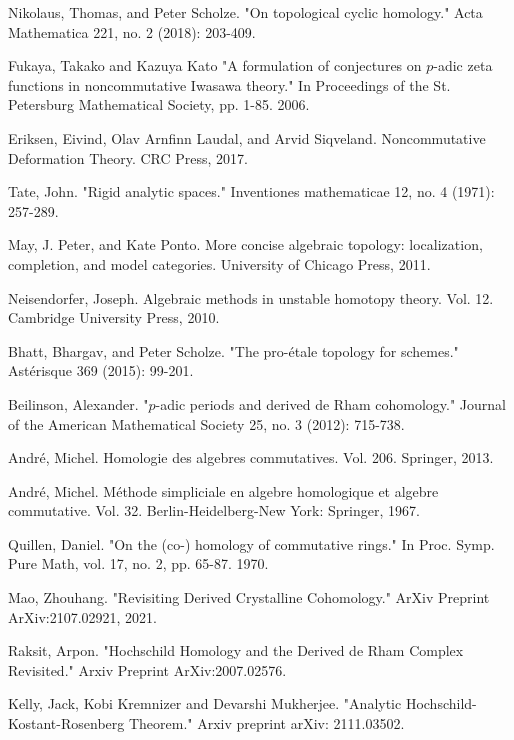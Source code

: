 \documentclass[11pt]{book}
\theoremstyle{definition}
\numberwithin{equation}{section}
\begin{document}
\begin{thebibliography}{10}
 Nikolaus, Thomas, and Peter Scholze. "On topological cyclic homology." Acta Mathematica 221, no. 2 (2018): 203-409.



 Fukaya, Takako and Kazuya Kato "A formulation of conjectures on $p$-adic zeta functions in noncommutative Iwasawa theory." In Proceedings of the St. Petersburg Mathematical Society, pp. 1-85. 2006.


 Eriksen, Eivind, Olav Arnfinn Laudal, and Arvid Siqveland. Noncommutative Deformation Theory. CRC Press, 2017.

 Tate, John. "Rigid analytic spaces." Inventiones mathematicae 12, no. 4 (1971): 257-289.

 May, J. Peter, and Kate Ponto. More concise algebraic topology: localization, completion, and model categories. University of Chicago Press, 2011.

 Neisendorfer, Joseph. Algebraic methods in unstable homotopy theory. Vol. 12. Cambridge University Press, 2010.

 Bhatt, Bhargav, and Peter Scholze. "The pro-\'etale topology for schemes." Ast\'erisque 369 (2015): 99-201.


 Beilinson, Alexander. "$p$-adic periods and derived de Rham cohomology." Journal of the American Mathematical Society 25, no. 3 (2012): 715-738. 

 Andr\'e, Michel. Homologie des algebres commutatives. Vol. 206. Springer, 2013. 

 Andr\'e, Michel. M\'ethode simpliciale en algebre homologique et algebre commutative. Vol. 32. Berlin-Heidelberg-New York: Springer, 1967.

 Quillen, Daniel. "On the (co-) homology of commutative rings." In Proc. Symp. Pure Math, vol. 17, no. 2, pp. 65-87. 1970.

 Mao, Zhouhang. "Revisiting Derived Crystalline Cohomology." ArXiv Preprint ArXiv:2107.02921, 2021.

 Raksit, Arpon. "Hochschild Homology and the Derived de Rham Complex Revisited." Arxiv Preprint ArXiv:2007.02576. 

 

 Kelly, Jack, Kobi Kremnizer and Devarshi Mukherjee. "Analytic Hochschild-Kostant-Rosenberg Theorem." Arxiv preprint arXiv: 2111.03502.


\end{thebibliography}
\end{document}
